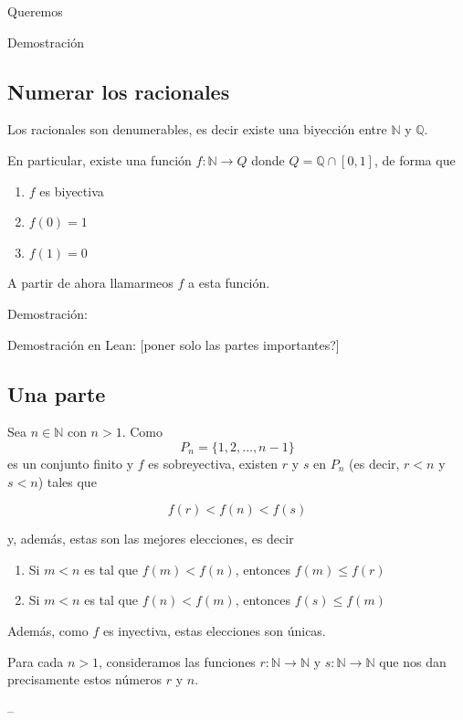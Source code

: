\documentclass{article}
\newcommand{\nat}{\mathbb{N}}
\newcommand{\rat}{\mathbb{Q}}
\begin{document}
Queremos 

Demostración


\subsection{Numerar los racionales}

Los racionales son denumerables, es decir existe una biyección entre $\nat$ y $\rat$.

En particular, existe una función $f : \nat \to Q$ donde $Q = \rat \cap [0, 1]$, de forma que

\begin{enumerate}
  \item $f$ es biyectiva
  \item $f(0) = 1$
  \item $f(1) = 0$
\end{enumerate}

A partir de ahora llamarmeos $f$ a esta función.

Demostración:

Demostración en Lean: [poner solo las partes importantes?]

\subsection{Una parte}

Sea $n \in \nat$ con $n > 1$. Como $$P_n = \{1, 2, \dots, n-1\}$$ es un conjunto finito y $f$ es sobreyectiva, existen $r$ y $s$ en $P_n$ (es decir, $r < n$ y $s < n$) tales que

\begin{equation} \label{cond_rs}
  f(r) < f(n) < f(s)
\end{equation}

y, además, estas son las mejores elecciones, es decir

\begin{enumerate}
  \item Si $m < n$ es tal que $f(m) < f(n)$, entonces $f(m) \leq f(r)$
  \item Si $m < n$ es tal que $f(n) < f(m)$, entonces $f(s) \leq f(m)$
\end{enumerate}

Además, como $f$ es inyectiva, estas elecciones son únicas.

Para cada $n > 1$, consideramos las funciones $r : \nat \to \nat$ y $s : \nat \to \nat$ que nos dan precisamente estos números $r$ y $n$.

--
\end{document}
